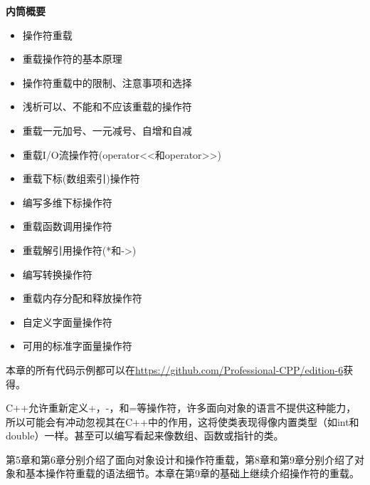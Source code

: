 \noindent
\textbf{内筒概要}

\begin{itemize}
\item
操作符重载

\item
重载操作符的基本原理

\item
操作符重载中的限制、注意事项和选择

\item
浅析可以、不能和不应该重载的操作符

\item
重载一元加号、一元减号、自增和自减

\item
重载I/O流操作符(operator<{}<和operator>{}>)

\item
重载下标(数组索引)操作符

\item
编写多维下标操作符

\item
重载函数调用操作符

\item
重载解引用操作符(*和->)

\item
编写转换操作符

\item
重载内存分配和释放操作符

\item
自定义字面量操作符

\item
可用的标准字面量操作符
\end{itemize}

本章的所有代码示例都可以在\url{https://github.com/Professional-CPP/edition-6}获得。

C++允许重新定义+，-，和=等操作符，许多面向对象的语言不提供这种能力，所以可能会有冲动忽视其在C++中的作用，这将使类表现得像内置类型（如int和double）一样。甚至可以编写看起来像数组、函数或指针的类。

第5章和第6章分别介绍了面向对象设计和操作符重载，第8章和第9章分别介绍了对象和基本操作符重载的语法细节。本章在第9章的基础上继续介绍操作符的重载。












